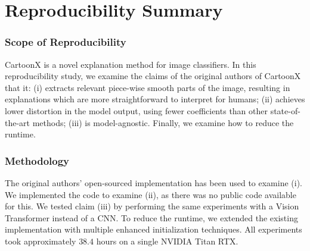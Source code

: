 \section*{\centering Reproducibility Summary}


\subsubsection*{Scope of Reproducibility}

CartoonX \cite{cartoonX} is a novel explanation method for image classifiers.
In this reproducibility study, we examine the claims of the original authors of CartoonX that it: (i) extracts relevant piece-wise smooth parts of the image, resulting in explanations which are more straightforward to interpret for humans; (ii) achieves lower distortion in the model output, using fewer coefficients than other state-of-the-art methods; (iii) is model-agnostic. Finally, we examine how to reduce the runtime.

\subsubsection*{Methodology}

The original authors' open-sourced implementation has been used to examine (i). We implemented the code to examine (ii), as there was no public code available for this. We tested claim (iii) by performing the same experiments with a Vision Transformer instead of a CNN. To reduce the runtime, we extended the existing implementation with multiple enhanced initialization techniques. All experiments took approximately $38.4$ hours on a single NVIDIA Titan RTX. %


